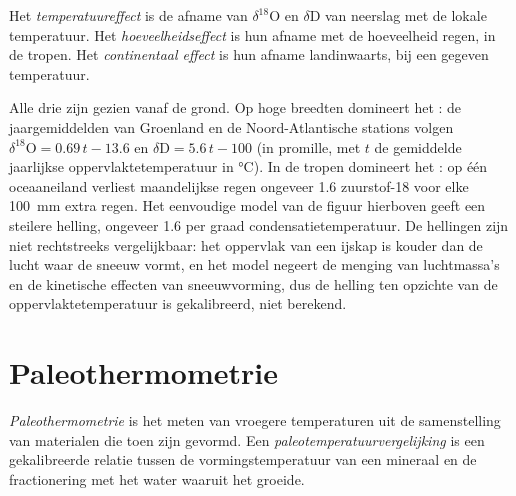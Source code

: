 \begin{definition}\label{def:b3:stable-isotopes:effects}
Het \emph{temperatuureffect} is de
afname van $\delta^{18}\mathrm O$ en $\delta\mathrm D$ van neerslag met de
lokale temperatuur. Het \emph{hoeveelheidseffect} is hun
afname met de hoeveelheid regen, in de tropen. Het \emph{continentaal
effect} is hun afname landinwaarts, bij een gegeven
temperatuur.
\end{definition}

Alle drie zijn  gezien vanaf de grond. Op hoge breedten
domineert het : de jaargemiddelden van Groenland en
de Noord-Atlantische stations volgen $\delta^{18}\mathrm O = 0.69\,t - 13.6$ en $\delta\mathrm D =
5.6\,t - 100$ (in promille, met $t$ de gemiddelde jaarlijkse oppervlaktetemperatuur in
\unit{\celsius}). In de tropen domineert het : op één oceaaneiland
verliest maandelijkse regen ongeveer \qty{1.6}{\permil} zuurstof-18 voor elke
\qty{100}{mm} extra regen. Het eenvoudige model van de figuur hierboven geeft een steilere
helling, ongeveer \qty{1.6}{\permil} per graad condensatietemperatuur. De
hellingen zijn niet rechtstreeks vergelijkbaar: het oppervlak van een ijskap is kouder
dan de lucht waar de sneeuw vormt, en het model negeert de menging van luchtmassa's
en de kinetische effecten van sneeuwvorming, dus de helling ten opzichte van de
oppervlaktetemperatuur is gekalibreerd, niet berekend.

\section{Paleothermometrie}\label{sec:b3:stable-isotopes:palaeothermometry}

\begin{definition}
\label{def:b3:stable-isotopes:palaeothermometry}
\emph{Paleothermometrie} is het meten van vroegere
temperaturen uit de samenstelling van materialen die toen zijn gevormd. Een
\emph{paleotemperatuurvergelijking} is een
gekalibreerde relatie tussen de vormingstemperatuur van een mineraal en de
fractionering met het water waaruit het groeide.
\end{definition}

